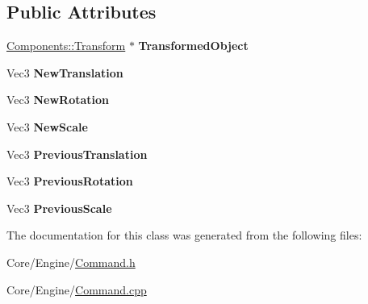 \subsection*{Public Attributes}
\begin{DoxyCompactItemize}
\item 
\hypertarget{classDCEngine_1_1CommandObjectTransform_a87af6501f861bf4a88f580c4d7b8db26}{\hyperlink{classDCEngine_1_1Components_1_1Transform}{Components\-::\-Transform} $\ast$ {\bfseries Transformed\-Object}}\label{classDCEngine_1_1CommandObjectTransform_a87af6501f861bf4a88f580c4d7b8db26}

\item 
\hypertarget{classDCEngine_1_1CommandObjectTransform_a08991276fe5d9d8423a8a8960d71fa5d}{Vec3 {\bfseries New\-Translation}}\label{classDCEngine_1_1CommandObjectTransform_a08991276fe5d9d8423a8a8960d71fa5d}

\item 
\hypertarget{classDCEngine_1_1CommandObjectTransform_afbca2f7afee9a8297fab5638e660c9b9}{Vec3 {\bfseries New\-Rotation}}\label{classDCEngine_1_1CommandObjectTransform_afbca2f7afee9a8297fab5638e660c9b9}

\item 
\hypertarget{classDCEngine_1_1CommandObjectTransform_ad3cfdcbd8f2ed5782c41e02db59115b1}{Vec3 {\bfseries New\-Scale}}\label{classDCEngine_1_1CommandObjectTransform_ad3cfdcbd8f2ed5782c41e02db59115b1}

\item 
\hypertarget{classDCEngine_1_1CommandObjectTransform_ad72961eae8d6afc5926ca421f27d2316}{Vec3 {\bfseries Previous\-Translation}}\label{classDCEngine_1_1CommandObjectTransform_ad72961eae8d6afc5926ca421f27d2316}

\item 
\hypertarget{classDCEngine_1_1CommandObjectTransform_ab7ea32692083790beb558a58e1f0c24c}{Vec3 {\bfseries Previous\-Rotation}}\label{classDCEngine_1_1CommandObjectTransform_ab7ea32692083790beb558a58e1f0c24c}

\item 
\hypertarget{classDCEngine_1_1CommandObjectTransform_a8ec66fcbfcb9d79a78edb70b1803012b}{Vec3 {\bfseries Previous\-Scale}}\label{classDCEngine_1_1CommandObjectTransform_a8ec66fcbfcb9d79a78edb70b1803012b}

\end{DoxyCompactItemize}


The documentation for this class was generated from the following files\-:\begin{DoxyCompactItemize}
\item 
Core/\-Engine/\hyperlink{Command_8h}{Command.\-h}\item 
Core/\-Engine/\hyperlink{Command_8cpp}{Command.\-cpp}\end{DoxyCompactItemize}

